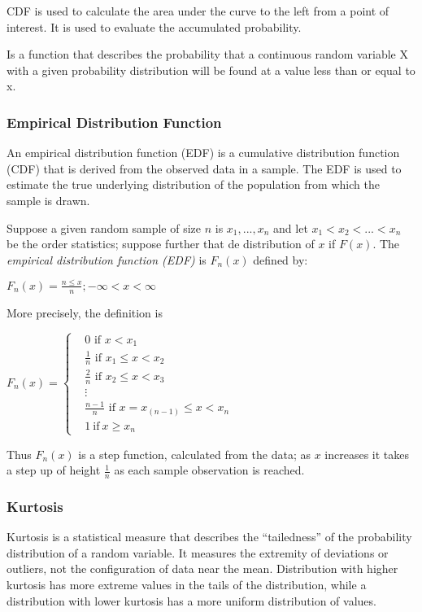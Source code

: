 \documentclass[11pt]{article}
\begin{document}
CDF is used to calculate the area under the curve to the left from a
point of interest. It is used to evaluate the accumulated probability.

Is a function that describes the probability that a continuous random
variable X with a given probability distribution will be found at a
value less than or equal to x.

\hypertarget{empirical-distribution-function}{%
\subsubsection{Empirical Distribution
Function}\label{empirical-distribution-function}}

An empirical distribution function (EDF) is a cumulative distribution
function (CDF) that is derived from the observed data in a sample. The
EDF is used to estimate the true underlying distribution of the
population from which the sample is drawn.

Suppose a given random sample of size \(n\) is \(x_1, ..., x_n\) and let
\(x_1 < x_2 < ... < x_n\) be the order statistics; suppose further that
de distribution of \(x\) if \(F(x)\). The \emph{empirical distribution
function (EDF)} is \(F_n(x)\) defined by:

\(F_n(x) = \frac{n \leq x}{n}; -\infty < x < \infty\)

More precisely, the definition is

\(F_n(x) = \begin{cases}  & 0 \text{ if } x < x_1\\  & \frac{1}{n} \text{ if } x_1 \leq x <x_2 \\  & \frac{2}{n} \text{ if } x_2 \leq x < x_3 \\  & \vdots \\  & \frac{n-1}{n}\text{ if } x = x_(n-1) \leq x < x_n \\  & 1 \ \text{if} \ x \geq x_n \end{cases}\)

Thus \(F_n(x)\) is a step function, calculated from the data; as \(x\)
increases it takes a step up of height \(\frac{1}{n}\) as each sample
observation is reached.


\hypertarget{kurtosis}{%
\subsubsection{Kurtosis}\label{kurtosis}}

Kurtosis is a statistical measure that describes the ``tailedness'' of
the probability distribution of a random variable. It measures the
extremity of deviations or outliers, not the configuration of data near
the mean. Distribution with higher kurtosis has more extreme values in
the tails of the distribution, while a distribution with lower kurtosis
has a more uniform distribution of values.
\end{document}
